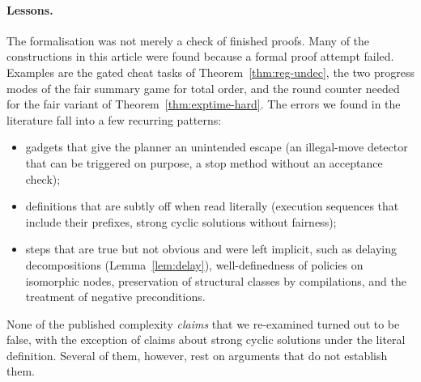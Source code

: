 \paragraph{Lessons.}
The formalisation was not merely a check of finished proofs. Many of the constructions in this
article were found because a formal proof attempt failed. Examples are the gated cheat tasks of
Theorem~\ref{thm:reg-undec}, the two progress modes of the fair summary game for total order, and
the round counter needed for the fair variant of Theorem~\ref{thm:exptime-hard}. The errors we found
in the literature fall into a few recurring patterns:
\begin{itemize}
  \item gadgets that give the planner an unintended escape (an illegal-move detector that can be
    triggered on purpose, a stop method without an acceptance check);
  \item definitions that are subtly off when read literally (execution sequences that include their
    prefixes, strong cyclic solutions without fairness);
  \item steps that are true but not obvious and were left implicit, such as delaying
    decompositions (Lemma~\ref{lem:delay}), well-definedness of policies on isomorphic nodes,
    preservation of structural classes by compilations, and the treatment of negative
    preconditions.
\end{itemize}
None of the published complexity \emph{claims} that we re-examined turned out to be false, with the
exception of claims about strong cyclic solutions under the literal definition. Several of them,
however, rest on arguments that do not establish them.

